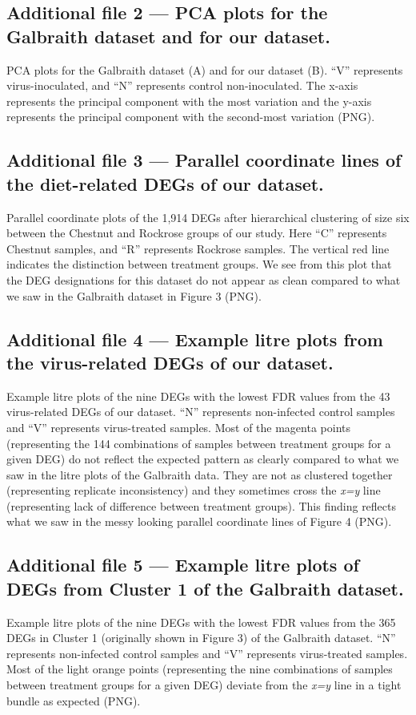\documentclass{bmcart}
\begin{document}
\begin{linenumbers}
\begin{backmatter}
  \subsection*{Additional file 2 --- PCA plots for the Galbraith dataset and for our dataset.}
    PCA plots for the Galbraith dataset (A) and for our dataset (B). ``V'' represents virus-inoculated, and ``N'' represents control non-inoculated. The x-axis represents the principal component with the most variation and the y-axis represents the principal component with the second-most variation (PNG).

  \subsection*{Additional file 3 --- Parallel coordinate lines of the diet-related DEGs of our dataset.}
    Parallel coordinate plots of the 1,914 DEGs after hierarchical clustering of size six between the Chestnut and Rockrose groups of our study. Here ``C'' represents Chestnut samples, and ``R'' represents Rockrose samples. The vertical red line indicates the distinction between treatment groups. We see from this plot that the DEG designations for this dataset do not appear as clean compared to what we saw in the Galbraith dataset in Figure 3 (PNG).

  \subsection*{Additional file 4 --- Example litre plots from the virus-related DEGs of our dataset.}
    Example litre plots of the nine DEGs with the lowest FDR values from the 43 virus-related DEGs of our dataset. ``N'' represents non-infected control samples and ``V'' represents virus-treated samples. Most of the magenta points (representing the 144 combinations of samples between treatment groups for a given DEG) do not reflect the expected pattern as clearly compared to what we saw in the litre plots of the Galbraith data. They are not as clustered together (representing replicate inconsistency) and they sometimes cross the \textit{x=y} line (representing lack of difference between treatment groups). This finding reflects what we saw in the messy looking parallel coordinate lines of Figure 4 (PNG).

  \subsection*{Additional file 5 --- Example litre plots of DEGs from Cluster 1 of the Galbraith dataset.}
    Example litre plots of the nine DEGs with the lowest FDR values from the 365 DEGs in Cluster 1 (originally shown in Figure 3) of the Galbraith dataset. ``N'' represents non-infected control samples and ``V'' represents virus-treated samples. Most of the light orange points (representing the nine combinations of samples between treatment groups for a given DEG) deviate from the \textit{x=y} line in a tight bundle as expected (PNG).


\end{backmatter}
\end{linenumbers}
\end{document}
